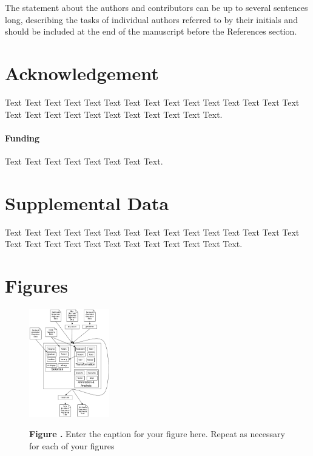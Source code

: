 \documentclass{frontiersSCNS} %
\begin{document}
The statement about the authors and contributors can be up to several sentences long, describing the tasks of individual authors referred to by their initials and should be included at the end of the manuscript before the References section.


\section*{Acknowledgement}
Text Text Text Text Text Text  Text Text Text Text Text Text Text Text  Text Text Text Text Text Text Text Text Text  Text Text Text.

\paragraph{Funding\textcolon} Text Text Text Text Text Text  Text Text.

\section*{Supplemental Data}
Text Text Text Text Text Text  Text Text Text Text Text Text Text Text Text  Text Text Text Text Text Text Text Text Text  Text Text Text.



\section*{Figures}


\begin{figure}
\begin{center}
\includegraphics[width=3.5cm]{FAST_v2}%
\end{center}
 \textbf{\label{fig:01} Figure .}{ Enter the caption for your figure here.  Repeat as  necessary for each of your figures }
\end{figure}
\end{document}
